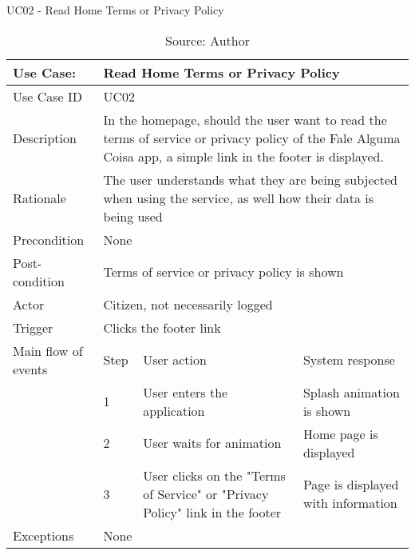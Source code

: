 \begin{table}[h]
\centering
\caption{UC02 - Read Home Terms or Privacy Policy}
\label{uc:02}
\begin{tabular}{|p{3cm}|p{1cm}|p{5cm}|p{5cm}|}
\hline
Use Case:       & \multicolumn{3}{p{11cm}|}{Read Home Terms or Privacy Policy} \\ \hline
Use Case ID     & \multicolumn{3}{p{11cm}|}{UC02} \\ \hline
Description     & \multicolumn{3}{p{11cm}|}{In the homepage, should the user want to read the terms of service or privacy policy of the Fale Alguma Coisa app, a simple link in the footer is displayed.} \\ \hline
Rationale       & \multicolumn{3}{p{11cm}|}{The user understands what they are being subjected when using the service, as well how their data is being used} \\ \hline
Precondition    & \multicolumn{3}{p{11cm}|}{None} \\ \hline
Post-condition  & \multicolumn{3}{p{11cm}|}{Terms of service or privacy policy is shown} \\ \hline
Actor           & \multicolumn{3}{p{11cm}|}{Citizen, not necessarily logged} \\ \hline
Trigger         & \multicolumn{3}{p{11cm}|}{Clicks the footer link} \\ \hline
Main flow of events & Step  & User action & System response \\ \hline
                    & 1     & User enters the application & Splash animation is shown \\ \hline
                    & 2     & User waits for animation & Home page is displayed \\ \hline
                    & 3     & User clicks on the "Terms of Service" or "Privacy Policy" link in the footer & Page is displayed with information\\ \hline
Exceptions      & \multicolumn{3}{p{11cm}|}{None} \\ \hline
\end{tabular}
\caption*{Source: Author}
\end{table}

